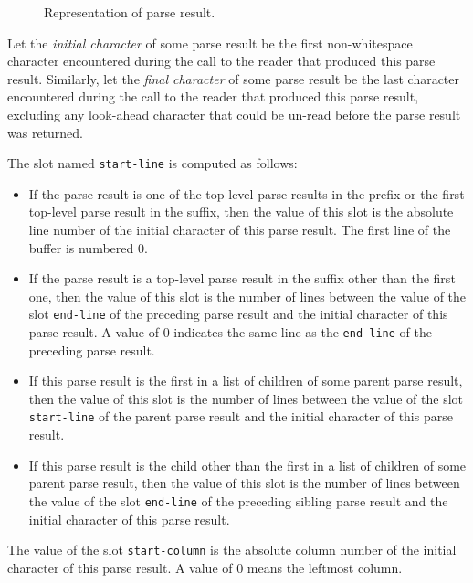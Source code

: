 \begin{figure}
\begin{center}
\end{center}
\caption{\label{fig-parse-result}
Representation of parse result.}
\end{figure}

Let the \emph{initial character} of some parse result be the first
non-whitespace character encountered during the call to the reader
that produced this parse result.  Similarly, let the \emph{final
  character} of some parse result be the last character encountered
during the call to the reader that produced this parse result,
excluding any look-ahead character that could be un-read before the
parse result was returned.

The slot named \texttt{start-line} is computed as follows:

\begin{itemize}
\item If the parse result is one of the top-level parse results in the
  prefix or the first top-level parse result in the suffix, then the
  value of this slot is the absolute line number of the initial
  character of this parse result.  The first line of the buffer is
  numbered $0$.
\item If the parse result is a top-level parse result in the suffix
  other than the first one, then the value of this slot is the number
  of lines between the value of the slot \texttt{end-line} of the
  preceding parse result and the initial character of this parse
  result.  A value of $0$ indicates the same line as the
  \texttt{end-line} of the preceding parse result.
\item If this parse result is the first in a list of children of some
  parent parse result, then the value of this slot is the number of
  lines between the value of the slot \texttt{start-line} of the parent
  parse result and the initial character of this parse result.
\item If this parse result is the child other than the first in a list
  of children of some parent parse result, then the value of this slot
  is the number of lines between the value of the slot
  \texttt{end-line} of the preceding sibling parse result and the
  initial character of this parse result.
\end{itemize}

The value of the slot \texttt{start-column} is the absolute column
number of the initial character of this parse result.  A value of $0$
means the leftmost column.

